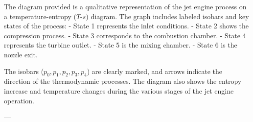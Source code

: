 The diagram provided is a qualitative representation of the jet engine process on a temperature-entropy (\( T \)-\( s \)) diagram. The graph includes labeled isobars and key states of the process:  
- State 1 represents the inlet conditions.  
- State 2 shows the compression process.  
- State 3 corresponds to the combustion chamber.  
- State 4 represents the turbine outlet.  
- State 5 is the mixing chamber.  
- State 6 is the nozzle exit.  

The isobars (\( p_0, p_1, p_2, p_3, p_4 \)) are clearly marked, and arrows indicate the direction of the thermodynamic processes. The diagram also shows the entropy increase and temperature changes during the various stages of the jet engine operation.

---